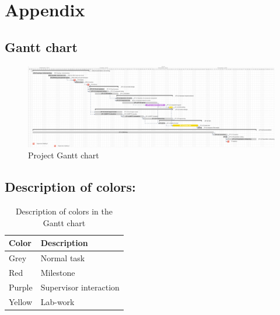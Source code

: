 \chapter{Appendix}



\clearpage


\begin{landscape}

\section{Gantt chart}


\begin{figure}[htbp]
	\begin{center}
		\includegraphics[width=1.6\textwidth]{../Pictures/Gantt_diagram_without_left_panel}
		\caption{Project Gantt chart}
		\label{gantt}
	\end{center}	
\end{figure}


\section*{Description of colors:}


\begin{table}[H]
	\centering
	\begin{tabular}{|p{3cm}|p{6cm}|} 
		\hline
		\textbf{Color} & \textbf{Description} \\ \hline
		Grey & Normal task  \\ \hline
		Red & Milestone  \\ \hline
		Purple & Supervisor interaction  \\ \hline
		Yellow &  Lab-work\\ \hline
	\end{tabular}
	\caption{Description of colors in the Gantt chart}
	\label{gantt_colors}
\end{table}

\end{landscape}
\clearpage



